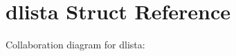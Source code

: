 \hypertarget{structdlista}{}\section{dlista Struct Reference}
\label{structdlista}


Collaboration diagram for dlista\+:
